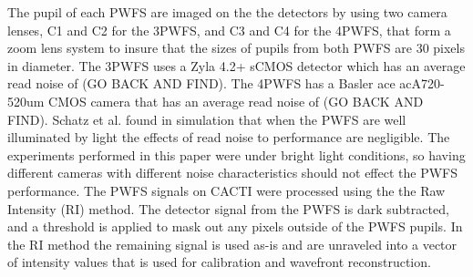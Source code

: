 \documentclass[12pt]{spieman}  %
\begin{document}
\begin{spacing}{2}
The pupil of each PWFS are imaged on the the detectors by using two camera lenses, C1 and C2 for the 3PWFS, and C3 and C4 for the 4PWFS,  that form a zoom lens system to insure that the sizes of pupils from both PWFS are 30 pixels in diameter. The 3PWFS uses a Zyla 4.2+ sCMOS detector which has an average read noise of (GO BACK AND FIND). The 4PWFS has a Basler ace acA720-520um CMOS camera that has an average read noise of (GO BACK AND FIND). Schatz et al. found in simulation that when the PWFS are well illuminated by light the effects of read noise to performance are negligible. The experiments performed in this paper were under bright light conditions, so having different cameras with different noise characteristics should not effect the PWFS performance. The PWFS signals on CACTI were processed using the the Raw Intensity (RI) method. The detector signal from the PWFS is dark subtracted, and a threshold is applied to mask out any pixels outside of the PWFS pupils. In the RI method the remaining signal is used as-is and are unraveled into a vector of intensity values that is used for calibration and wavefront reconstruction.







\end{spacing}
\end{document}
